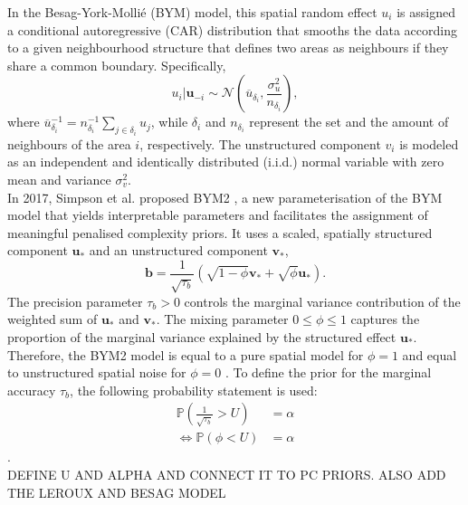 In the Besag-York-Mollié (BYM) \autocite[][]{besag1991bayesian} model, this spatial random effect $u_i$ is assigned a conditional autoregressive (CAR) distribution that smooths the data according to a given neighbourhood structure that defines two areas as neighbours if they share a common boundary. Specifically,
\begin{equation}
    u_i|\pmb{u}_{-i}\sim\mathcal{N}\left(\overline{u}_{\delta_i}, \frac{\sigma_u^2}{n_{\delta_i}}\right),
\end{equation}
where $\overline{u}_{\delta_i}^{-1}=n_{\delta_i}^{-1}\sum_{j\in\delta_i} u_j$, while $\delta_i$ and $n_{\delta_i}$ represent the set and the amount of neighbours of the area $i$, respectively. The unstructured component $v_i$ is modeled as an independent and identically distributed (i.i.d.) normal variable with zero mean and variance $\sigma_v^2$. \\
In 2017, Simpson et al. proposed BYM2 \autocite[][]{simpson2017penalising}, a new parameterisation of the BYM model that yields interpretable parameters and facilitates the assignment of meaningful penalised complexity priors. It uses a scaled, spatially structured component $\pmb{u_*}$ and an unstructured component $\pmb{v_*}$,
\begin{equation}
    \pmb{b}=\frac{1}{\sqrt{\tau_b}}\left(\sqrt{1-\phi}\pmb{v_*}+\sqrt{\phi}\pmb{u_*}\right).
\end{equation}
The precision parameter $\tau_b > 0$ controls the marginal variance contribution of the weighted sum of $\pmb{u_*}$ and $\pmb{v_*}$. The mixing parameter $0\leq\phi\leq1$ captures the proportion of the marginal variance explained by the structured effect $\pmb{u}_*$. Therefore, the BYM2 model is equal to a pure spatial model for $\phi=1$ and equal to unstructured spatial noise for $\phi=0$ \autocite[][]{riebler2016intuitive}. To define the prior for the marginal accuracy $\tau_b$, the following probability statement is used:
\begin{align}
    \mathbb{P}\left(\frac{1}{\sqrt{\tau_b}}>U\right)&=\alpha\nonumber\\
    \Longleftrightarrow\mathbb{P}\left(\phi <U\right)&=\alpha
\end{align}
\autocite[][]{moraga2019geospatial}. \\
DEFINE U AND ALPHA AND CONNECT IT TO PC PRIORS. ALSO ADD THE LEROUX AND BESAG MODEL

